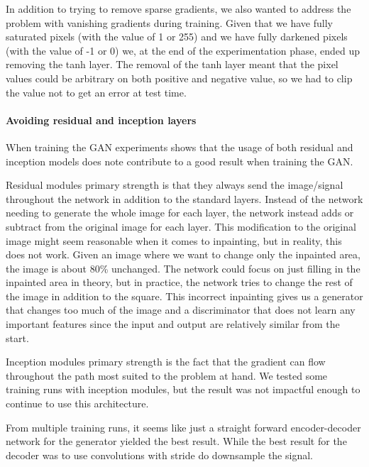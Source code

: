 
In addition to trying to remove sparse gradients, we also wanted to address the problem with vanishing gradients during training. Given that we have fully saturated pixels (with the value of 1 or 255) and we have fully darkened pixels (with the value of -1 or 0) we, at the end of the experimentation phase, ended up removing the tanh layer. 
The removal of the tanh layer meant that the pixel values could be arbitrary on both positive and negative value, so we had to clip the value not to get an error at test time. 



\paragraph{Avoiding residual and inception layers}
When training the GAN experiments shows that the usage of both residual \cite{Rumelhart:1986:LIR:104279.104293} and inception \cite{DBLP:journals/corr/SzegedyLJSRAEVR14} models does note contribute to a good result when training the GAN.

Residual modules primary strength is that they always send the image/signal throughout the network in addition to the standard layers. Instead of the network needing to generate the whole image for each layer, the network instead adds or subtract from the original image for each layer.
This modification to the original image might seem reasonable when it comes to inpainting, but in reality, this does not work.  Given an image where we want to change only the inpainted area, the image is about 80\% unchanged. The network could focus on just filling in the inpainted area in theory, but in practice, the network tries to change the rest of the image in addition to the square. This incorrect inpainting gives us a generator that changes too much of the image and a discriminator that does not learn any important features since the input and output are relatively similar from the start.

Inception modules primary strength is the fact that the gradient can flow throughout the path most suited to the problem at hand.
We tested some training runs with inception modules, but the result was not impactful enough to continue to use this architecture.

From multiple training runs, it seems like just a straight forward encoder-decoder network for the generator yielded the best result. While the best result for the decoder was to use convolutions with stride do downsample the signal.

